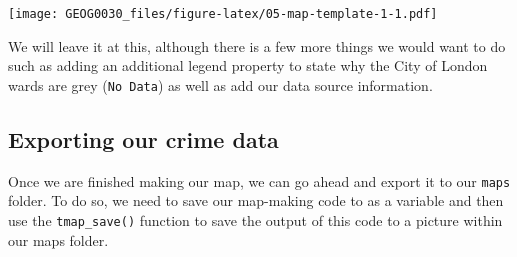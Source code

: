 \documentclass[
]{book}
\begin{document}
\texttt{[image: GEOG0030\_files/figure-latex/05-map-template-1-1.pdf]}

We will leave it at this, although there is a few more things we would want to do such as adding an additional legend property to state why the City of London wards are grey (\texttt{No\ Data}) as well as add our data source information.

\hypertarget{exporting-our-crime-data}{%
\subsection{Exporting our crime data}\label{exporting-our-crime-data}}

Once we are finished making our map, we can go ahead and export it to our \texttt{maps} folder. To do so, we need to save our map-making code to as a variable and then use the \texttt{tmap\_save()} function to save the output of this code to a picture within our maps folder.
\end{document}
